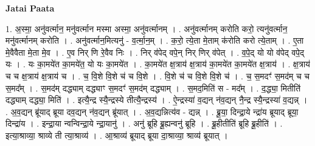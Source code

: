 \documentclass[17pt]{extarticle}
\begin{document}
\textbf{Jatai Paata} \newline

1. अ॒स्मा॒ अनु॑वर्त्मान॒ मनु॑वर्त्मान मस्मा अस्मा॒ अनु॑वर्त्मानम् । . अनु॑वर्त्मानम् करोति करो॒ त्यनु॑वर्त्मान॒ मनु॑वर्त्मानम् करोति । . अनु॑वर्त्मान॒मित्यनु॑ - व॒र्त्मा॒न॒म् । . क॒रो॒ त्ये॒ता मे॒ताम् क॑रोति करो त्ये॒ताम् । . ए॒ता मे॒वैवैता मे॒ता मे॒व । . ए॒व निर् णि रे॒वैव निः । . निर् व॑पेद् वपे॒न् निर् णिर् व॑पेत् । . व॒पे॒द् यो यो व॑पेद् वपे॒द् यः । . यः का॒मये॑त का॒मये॑त॒ यो यः का॒मये॑त । . का॒मये॑त क्ष॒त्राय॑ क्ष॒त्राय॑ का॒मये॑त का॒मये॑त क्ष॒त्राय॑ । . क्ष॒त्राय॑ च च क्ष॒त्राय॑ क्ष॒त्राय॑ च । . च॒ वि॒शे वि॒शे च॑ च वि॒शे । . वि॒शे च॑ च वि॒शे वि॒शे च॑ । . च॒ स॒मदꣳ॑ स॒मद॑म् च च स॒मद᳚म् । . स॒मद॑म् दद्ध्याम् दद्ध्याꣳ स॒मदꣳ॑ स॒मद॑म् दद्ध्याम् । . स॒मद॒मिति॑ स - मद᳚म् । . द॒द्ध्या॒ मितीति॑ दद्ध्याम् दद्ध्या॒ मिति॑ । . इत्यै॒न्द्र स्यै॒न्द्रस्ये तीत्यै॒न्द्रस्य॑ । . ऐ॒न्द्रस्या॑ व॒द्यन् न॑व॒द्यन् नै॒न्द्र स्यै॒न्द्रस्या॑ व॒द्यन्न् । . अ॒व॒द्यन् ब्रू॑याद् ब्रूया दव॒द्यन् न॑व॒द्यन् ब्रू॑यात् । . अ॒व॒द्यन्नित्य॑व - द्यन्न् । . ब्रू॒या॒ दिन्द्रा॒ये न्द्रा॑य ब्रूयाद् ब्रूया॒ दिन्द्रा॑य । . इन्द्रा॒या न्वन्विन्द्रा॒ये न्द्रा॒यानु॑ । . अनु॑ ब्रूहि ब्रू॒ह्यन्वनु॑ ब्रूहि । . ब्रू॒हीतीति॑ ब्रूहि ब्रू॒हीति॑ । . इत्या॒श्राव्या॒ श्राव्ये ती त्या॒श्राव्य॑ । . आ॒श्राव्य॑ ब्रूयाद् ब्रूया दा॒श्राव्या॒ श्राव्य॑ ब्रूयात् । \newline
\end{document}
